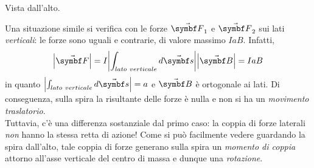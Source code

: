 \begin{center}
\begin{minipage}{0.49\textwidth}
\begin{center}
		\end{center}
		\begin{center}
		{\scriptsize Vista dall'alto.}
		\end{center}
	\end{minipage}
\end{center}
Una situazione simile si verifica con le forze $\vba{F}_{1}$ e $\vba{F}_2$ sui lati \textit{verticali}: le forze sono uguali e contrarie, di valore massimo $IaB$. Infatti,
	\begin{equation*}
		\abs{\vba{F}}=I\abs{\int_{lato\ verticale} d\vba{s}}\abs{\vba{B}}=IaB
	\end{equation*}
in quanto $\abs{\int_{lato\ verticale} d\vba{s}}=a$ e $\vba{B}$ è ortogonale ai lati. Di conseguenza, sulla spira la risultante delle forze è nulla e non si ha un \textit{movimento traslatorio}.\\
Tuttavia, c'è una differenza sostanziale dal primo caso: la coppia di forze laterali \textit{non} hanno la stessa retta di azione! Come si può facilmente vedere guardando la spira dall'alto, tale coppia di forze generano sulla spira un \textit{momento di coppia} attorno all'asse verticale del centro di massa e dunque una \textit{rotazione}.

